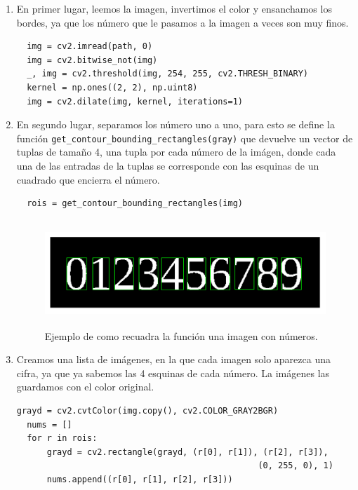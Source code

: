 \documentclass[size=a4, parskip=half, titlepage=false, toc=flat, toc=bib, 12pt]{scrartcl}
\begin{document}
\begin{enumerate}

\item En primer lugar, leemos la imagen, invertimos el color y ensanchamos los bordes, ya que los número que le pasamos a la imagen a veces son muy finos.

\begin{verbatim}
  img = cv2.imread(path, 0)
  img = cv2.bitwise_not(img)
  _, img = cv2.threshold(img, 254, 255, cv2.THRESH_BINARY)
  kernel = np.ones((2, 2), np.uint8)
  img = cv2.dilate(img, kernel, iterations=1)
\end{verbatim}

\item En segundo lugar, separamos los número uno a uno, para esto se define la función \verb|get_contour_bounding_rectangles(gray)| que devuelve un vector de tuplas de tamaño 4, una tupla por cada número de la imágen, donde cada una de las entradas de la tuplas se corresponde con las esquinas de un cuadrado que encierra el número.

\begin{verbatim}
  rois = get_contour_bounding_rectangles(img)
\end{verbatim}

\begin{figure}[H]
\centering
\includegraphics[height=4cm]{./img/numeros}
\caption{Ejemplo de como recuadra la función una imagen con números.}
\end{figure}

\item Creamos una lista de imágenes, en la que cada imagen solo aparezca una cifra, ya que ya sabemos las 4 esquinas de cada número. La imágenes las guardamos con el color original.

\begin{verbatim}
grayd = cv2.cvtColor(img.copy(), cv2.COLOR_GRAY2BGR)
  nums = []
  for r in rois:
      grayd = cv2.rectangle(grayd, (r[0], r[1]), (r[2], r[3]),
                                                (0, 255, 0), 1)
      nums.append((r[0], r[1], r[2], r[3]))
\end{verbatim}


\end{enumerate}
\end{document}
